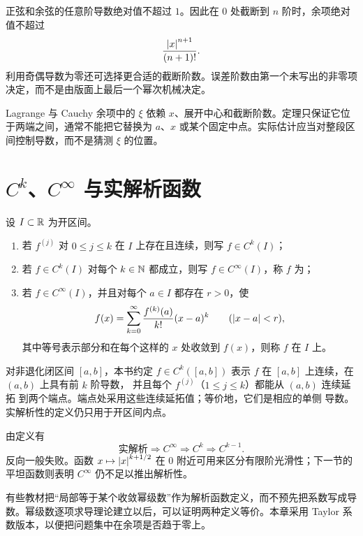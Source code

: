 \begin{example}[正弦与余弦]
正弦和余弦的任意阶导数绝对值不超过 \(1\)。因此在 \(0\) 处截断到 \(n\) 阶时，余项绝对值不超过
\[
 \frac{\left|x\right|^{n+1}}{(n+1)!}.
\]
利用奇偶导数为零还可选择更合适的截断阶数。误差阶数由第一个未写出的非零项决定，而不是由版面上最后一个幂次机械决定。
\end{example}

\begin{warningbox}[中间点不能预先指定]
Lagrange 与 Cauchy 余项中的 \(\xi\) 依赖 \(x\)、展开中心和截断阶数。定理只保证它位于两端之间，通常不能把它替换为 \(a\)、\(x\) 或某个固定中点。实际估计应当对整段区间控制导数，而不是猜测 \(\xi\) 的位置。
\end{warningbox}

\section{\texorpdfstring{\(C^k\)、\(C^\infty\)}{Ck, C-infinity} 与实解析函数}

\begin{definition}
设 \(I\subset\mathbb{R}\) 为开区间。
\begin{enumerate}
 \item 若 \(f^{(j)}\) 对 \(0\le j\le k\) 在 \(I\) 上存在且连续，则写 \(f\in C^k(I)\)；
 \item 若 \(f\in C^k(I)\) 对每个 \(k\in\mathbb{N}\) 都成立，则写 \(f\in C^\infty(I)\)，称 \(f\) 为；
 \item 若 \(f\in C^\infty(I)\)，并且对每个 \(a\in I\) 都存在 \(r>0\)，使
 \[
  f(x)=\sum_{k=0}^{\infty}\frac{f^{(k)}(a)}{k!}(x-a)^k
  \qquad(\left|x-a\right|<r),
 \]
 其中等号表示部分和在每个这样的 \(x\) 处收敛到 \(f(x)\)，则称 \(f\) 在 \(I\) 上。
\end{enumerate}
\end{definition}

对非退化闭区间 \([a,b]\)，本书约定 \(f\in C^k([a,b])\) 表示
\(f\) 在 \([a,b]\) 上连续，在 \((a,b)\) 上具有前 \(k\) 阶导数，
并且每个 \(f^{(j)}\)（\(1\le j\le k\)）都能从 \((a,b)\) 连续延拓
到两个端点。端点处采用这些连续延拓值；等价地，它们是相应的单侧
导数。实解析性的定义仍只用于开区间内点。

由定义有
\[
 \text{实解析}\Longrightarrow C^\infty
 \Longrightarrow C^k\Longrightarrow C^{k-1}.
\]
反向一般失败。函数 \(x\mapsto\left|x\right|^{k+1/2}\) 在 \(0\) 附近可用来区分有限阶光滑性；下一节的平坦函数则表明 \(C^\infty\) 仍不足以推出解析性。

有些教材把“局部等于某个收敛幂级数”作为解析函数定义，而不预先把系数写成导数。幂级数逐项求导理论建立以后，可以证明两种定义等价。本章采用 Taylor 系数版本，以便把问题集中在余项是否趋于零上。

